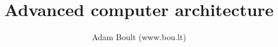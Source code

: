 \documentclass[oneside]{book}
\begin{document}
\author{Adam Boult (www.bou.lt)}
\title{Advanced computer architecture}
\maketitle

\setcounter{tocdepth}{0}
\tableofcontents


\end{document}

